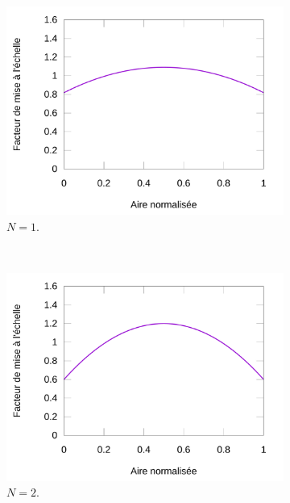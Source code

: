 	\begin{figure}[!htb]
		\begin{subfigure}[t]{0.49\textwidth}
			\centering
			\includegraphics[width=\textwidth]{figures/ch5/parabola1}
			\caption{$N=1$.}
			\label{fig:parabola1}
		\end{subfigure}
		~
		\begin{subfigure}[t]{0.49\textwidth}
			\centering
			\includegraphics[width=\textwidth]{figures/ch5/parabola2}
			\caption{$N=2$.}
			\label{fig:parabola2}
		\end{subfigure}
		~
		\begin{subfigure}[t]{0.49\textwidth}
			\centering

\end{subfigure}
\end{figure}
